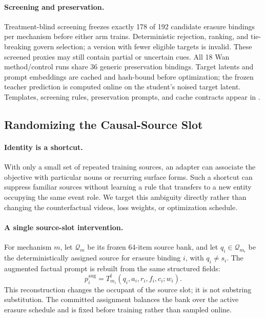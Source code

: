 \paragraph{Screening and preservation.}
Treatment-blind screening freezes exactly 178 of 192 candidate erasure
bindings per mechanism before either arm trains. Deterministic rejection,
ranking, and tie-breaking govern selection; a version with fewer eligible
targets is invalid. These screened proxies may still contain partial or
uncertain cues. All 18 Wan method/control runs share 36 generic preservation
bindings. Target latents and prompt embeddings are cached and hash-bound
before optimization; the frozen teacher prediction is computed online on the
student's noised target latent. Templates, screening rules, preservation
prompts, and cache contracts appear in .

\subsection{Randomizing the Causal-Source Slot}
\label{subsec:source-slot-randomization}

\paragraph{Identity is a shortcut.}
With only a small set of repeated training sources, an adapter can associate
the objective with particular nouns or recurring surface forms. Such a
shortcut can suppress familiar sources without learning a rule that transfers
to a new entity occupying the same event role. We target this ambiguity
directly rather than changing the counterfactual videos, loss weights, or
optimization schedule.

\paragraph{A single source-slot intervention.}
For mechanism \(m\), let \(\mathcal{Q}_m\) be its frozen 64-item source bank,
and let \(q_i\in\mathcal{Q}_{m_i}\) be the deterministically assigned source
for erasure binding \(i\), with \(q_i\neq s_i\). The augmented factual prompt
is rebuilt from the same structured fields:
\begin{equation}
  p_i^{\mathrm{aug}}
  =
  T_{m_i}^{\mathrm f}(q_i,a_i,r_i,f_i,c_i;w_i).
  \label{eq:source-slot-prompt}
\end{equation}
This reconstruction changes the occupant of the source slot; it is not
substring substitution. The committed assignment balances the bank over the
active erasure schedule and is fixed before training rather than sampled
online.

